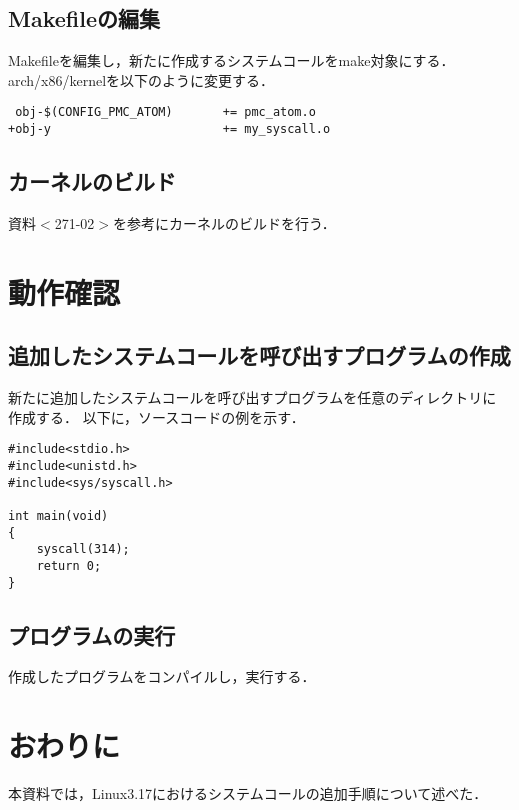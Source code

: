 \documentclass[12pt]{jsarticle}
\begin{document}
\subsection{Makefileの編集}
Makefileを編集し，新たに作成するシステムコールをmake対象にする．
arch/x86/kernelを以下のように変更する．
\begin{verbatim}
 obj-$(CONFIG_PMC_ATOM)       += pmc_atom.o
+obj-y                        += my_syscall.o 
\end{verbatim}
\subsection{カーネルのビルド}
資料$<$271-02$>$を参考にカーネルのビルドを行う．
\section{動作確認}
\subsection{追加したシステムコールを呼び出すプログラムの作成}
新たに追加したシステムコールを呼び出すプログラムを任意のディレクトリに
作成する．
以下に，ソースコードの例を示す．
\begin{verbatim}
#include<stdio.h>
#include<unistd.h>
#include<sys/syscall.h>

int main(void)
{
    syscall(314);
    return 0;
}
\end{verbatim}
\subsection{プログラムの実行}
作成したプログラムをコンパイルし，実行する．

\section{おわりに}
本資料では，Linux3.17におけるシステムコールの追加手順について述べた．
\end{document}
